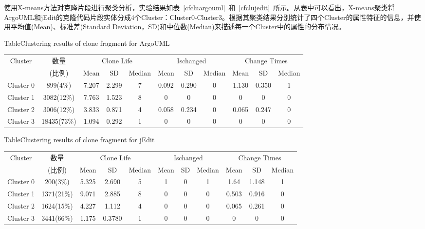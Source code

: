 使用X-means方法对克隆片段进行聚类分析，实验结果如表~\ref{cfcluargouml}~和~\ref{cfclujedit}~所示。从表中可以看出，X-means聚类将ArgoUML和jEdit的克隆代码片段实体分成4个Cluster：Cluster0-Cluster3。根据其聚类结果分别统计了四个Cluster的属性特征的信息，并使用平均值(Mean)、标准差(Standard Deviation，SD)和中位数(Median)来描述每一个Cluster中的属性的分布情况。

\begin{table}[htbp]
{Table$\!$}{Clustering results of clone fragment for ArgoUML}
\vspace{0.5em}
\centering
\footnotesize
\begin{tabular}{ccccccccccc}
\toprule[1.5pt]
\multirow{2}{*}{Cluster}&{数量}&\multicolumn{3}{c}{Clone Life}&\multicolumn{3}{c}{Ischanged}&\multicolumn{3}{c}{Change Times} \\
\cline{3-11}
&(比例)&{Mean}&SD &{Median}&{Mean}&SD &{Median}&{Mean}&SD &{Median}\\
\midrule[1pt]
Cluster 0&899(4\%)&7.207&2.299&7&0.092&0.290&0&1.130&0.350&1\\ 
Cluster 1&3082(12\%)&7.763&1.523&8&0&0&0	&0&0&0\\ 
Cluster 2&3006(12\%)&3.833&0.871&4&0.058&0.234&0	&0.065&0.247&0\\ 
Cluster 3&18435(73\%)&1.094&0.292&1	&0	&0	&0	&0	&0	&0\\ 
\bottomrule[1.5pt]
\end{tabular}
\end{table}

\begin{table}[htbp]
{Table$\!$}{Clustering results of clone fragment for jEdit}
\vspace{0.5em}
\centering
\footnotesize
\begin{tabular}{ccccccccccc}
\toprule[1.5pt]
\multirow{2}{*}{Cluster}&{数量}&\multicolumn{3}{c}{Clone Life}&\multicolumn{3}{c}{Ischanged}&\multicolumn{3}{c}{Change Times} \\
\cline{3-11}
&(比例)&{Mean}&SD &{Median}&{Mean}&SD&{Median}&{Mean}&SD &{Median}\\
\midrule[1pt]
Cluster 0&200(3\%)&5.325&2.690&5&1	&0	&1	&1.64	&1.148&1\\ 
Cluster 1&1371(21\%)	&9.071&2.885&8	&0	&0	&0	&0.503&0.916&0\\ 
Cluster 2&	1624(15\%)	&4.227&1.112&4	&0	&0	&0	&0.065&0.261&0\\ 
Cluster 3&	3441(66\%)	&1.175	&0.3780&1	&0	&0	&0	&0	&0	&0\\ 
\bottomrule[1.5pt]
\end{tabular}
\end{table}

